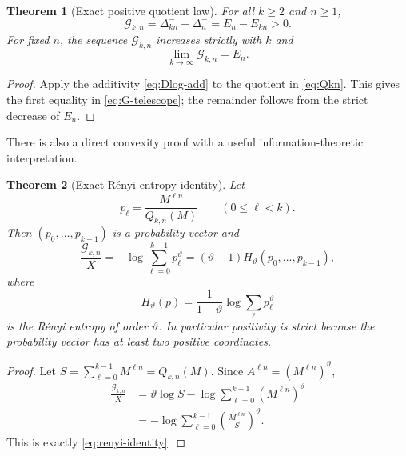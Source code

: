 \documentclass[11pt]{article}
\newtheorem{theorem}{Theorem}[section]
\theoremstyle{definition}
\newcommand{\vtheta}{\vartheta}
\begin{document}
\begin{theorem}[Exact positive quotient law]\label{thm:geometric-quotient}
For all $k\ge2$ and $n\ge1$,
\begin{equation}\label{eq:G-telescope}
 \mathcal G_{k,n}=\Delta_{kn}^--\Delta_n^-=E_n-E_{kn}>0.
\end{equation}
For fixed $n$, the sequence $\mathcal G_{k,n}$ increases strictly with $k$ and
\begin{equation}\label{eq:G-limit}
 \lim_{k\to\infty}\mathcal G_{k,n}=E_n.
\end{equation}
\end{theorem}

\begin{proof}
Apply the additivity \eqref{eq:Dlog-add} to the quotient in \eqref{eq:Qkn}.  This gives the
first equality in \eqref{eq:G-telescope}; the remainder follows from the strict decrease of
$E_n$.
\end{proof}

There is also a direct convexity proof with a useful information-theoretic interpretation.

\begin{theorem}[Exact R\'enyi-entropy identity]\label{thm:renyi}
Let
\begin{equation}\label{eq:geometric-prob}
 p_\ell=\frac{M^{\ell n}}{Q_{k,n}(M)}
 \qquad(0\le\ell<k).
\end{equation}
Then $(p_0,\dots,p_{k-1})$ is a probability vector and
\begin{equation}\label{eq:renyi-identity}
 \frac{\mathcal G_{k,n}}{X}
 =-\log\sum_{\ell=0}^{k-1}p_\ell^{\vtheta}
 =(\vtheta-1)H_{\vtheta}(p_0,\dots,p_{k-1}),
\end{equation}
where
\[
 H_{\vtheta}(p)=\frac{1}{1-\vtheta}
 \log\sum_\ell p_\ell^{\vtheta}
\]
is the R\'enyi entropy of order $\vtheta$.  In particular positivity is strict because the
probability vector has at least two positive coordinates.
\end{theorem}

\begin{proof}
Let $S=\sum_{\ell=0}^{k-1}M^{\ell n}=Q_{k,n}(M)$.  Since
$A^{\ell n}=(M^{\ell n})^{\vtheta}$,
\begin{align*}
 \frac{\mathcal G_{k,n}}X
 &=\vtheta\log S-
 \log\sum_{\ell=0}^{k-1}(M^{\ell n})^{\vtheta}\\
 &=-\log\sum_{\ell=0}^{k-1}
 \left(\frac{M^{\ell n}}S\right)^{\vtheta}.
\end{align*}
This is exactly \eqref{eq:renyi-identity}.
\end{proof}
\end{document}
